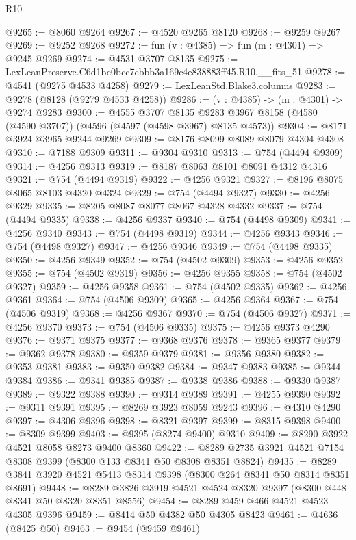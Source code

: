 \begin{lexlean}{R10}
\begin{coremodule}
@9265 := @8060 @9264
@9267 := @4520 @9265 @8120
@9268 := @9259 @9267
@9269 := @9252 @9268
@9272 := fun (v : @4385) => fun (m : @4301) => @9245 @9269
@9274 := @4531 @3707 @8135
@9275 := LexLeanPreserve.C6d1bc0bcc7cbbb3a169c4e838883ff45.R10.__fits_51
@9278 := @4541 (@9275 @4533 @4258)
@9279 := LexLeanStd.Blake3.columns
@9283 := @9278 (@8128 (@9279 @4533 @4258))
@9286 := (v : @4385) -> (m : @4301) -> @9274 @9283
@9300 := @4555
    @3707
    @8135
    @9283
    @3967
    @8158
    (@4580 (@4590 @3707))
    (@4596 (@4597 (@4598 @3967) @8135 @4573))
@9304 := @8171 @3924 @3965 @9244 @9269
@9309 := @8176 @8099 @8089 @8079 @4304 @4308
@9310 := @7188 @9309
@9311 := @9304 @9310
@9313 := @754 (@4494 @9309)
@9314 := @4256 @9313
@9319 := @8187 @8063 @8101 @8091 @4312 @4316
@9321 := @754 (@4494 @9319)
@9322 := @4256 @9321
@9327 := @8196 @8075 @8065 @8103 @4320 @4324
@9329 := @754 (@4494 @9327)
@9330 := @4256 @9329
@9335 := @8205 @8087 @8077 @8067 @4328 @4332
@9337 := @754 (@4494 @9335)
@9338 := @4256 @9337
@9340 := @754 (@4498 @9309)
@9341 := @4256 @9340
@9343 := @754 (@4498 @9319)
@9344 := @4256 @9343
@9346 := @754 (@4498 @9327)
@9347 := @4256 @9346
@9349 := @754 (@4498 @9335)
@9350 := @4256 @9349
@9352 := @754 (@4502 @9309)
@9353 := @4256 @9352
@9355 := @754 (@4502 @9319)
@9356 := @4256 @9355
@9358 := @754 (@4502 @9327)
@9359 := @4256 @9358
@9361 := @754 (@4502 @9335)
@9362 := @4256 @9361
@9364 := @754 (@4506 @9309)
@9365 := @4256 @9364
@9367 := @754 (@4506 @9319)
@9368 := @4256 @9367
@9370 := @754 (@4506 @9327)
@9371 := @4256 @9370
@9373 := @754 (@4506 @9335)
@9375 := @4256 @9373 @4290
@9376 := @9371 @9375
@9377 := @9368 @9376
@9378 := @9365 @9377
@9379 := @9362 @9378
@9380 := @9359 @9379
@9381 := @9356 @9380
@9382 := @9353 @9381
@9383 := @9350 @9382
@9384 := @9347 @9383
@9385 := @9344 @9384
@9386 := @9341 @9385
@9387 := @9338 @9386
@9388 := @9330 @9387
@9389 := @9322 @9388
@9390 := @9314 @9389
@9391 := @4255 @9390
@9392 := @9311 @9391
@9395 := @8269 @3923 @8059 @9243
@9396 := @4310 @4290
@9397 := @4306 @9396
@9398 := @8321 @9397
@9399 := @8315 @9398
@9400 := @8309 @9399
@9403 := @9395 (@8274 @9400) @9310
@9409 := @8290 @3922 @4521 @8058 @8273 @9400 @8360
@9422 := @8289 @2735 @3921 @4521 @7154 @8308 @9399 (@8300 @133 @8341 @50 @8308 @8351 @8824)
@9435 := @8289 @3841 @3920 @4521 @5413 @8314 @9398 (@8300 @264 @8341 @50 @8314 @8351 @8691)
@9448 := @8289 @3826 @3919 @4521 @4524 @8320 @9397 (@8300 @448 @8341 @50 @8320 @8351 @8556)
@9454 := @8289 @459 @466 @4521 @4523 @4305 @9396
@9459 := @8414 @50 @4382 @50 @4305 @8423
@9461 := @4636 (@8425 @50)
@9463 := @9454 (@9459 @9461)

\end{coremodule}
\end{lexlean}
